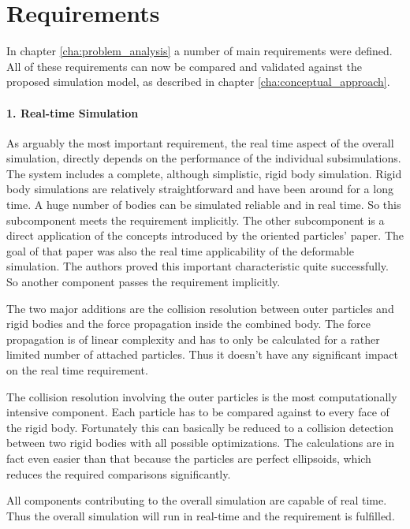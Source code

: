 \section{Requirements}

In chapter \ref{cha:problem_analysis} a number of main requirements were defined. All of these requirements can now be compared and validated against the proposed simulation model, as described in chapter \ref{cha:conceptual_approach}.

\paragraph{1. Real-time Simulation}

As arguably the most important requirement, the real time aspect of the overall simulation, directly depends on the performance of the individual subsimulations. The system includes a complete, although simplistic, rigid body simulation. Rigid body simulations are relatively straightforward and have been around for a long time. A huge number of bodies can be simulated reliable and in real time. So this subcomponent meets the requirement implicitly. The other subcomponent is a direct application of the concepts introduced by the oriented particles' paper. The goal of that paper was also the real time applicability of the deformable simulation. The authors proved this important characteristic quite successfully. So another component passes the requirement implicitly. 

The two major additions are the collision resolution between outer particles and rigid bodies and the force propagation inside the combined body. The force propagation is of linear complexity and has to only be calculated for a rather limited number of attached particles. Thus it doesn't have any significant impact on the real time requirement.

The collision resolution involving the outer particles is the most computationally intensive component. Each particle has to be compared against to every face of the rigid body. Fortunately this can basically be reduced to a collision detection between two rigid bodies with all possible optimizations. The calculations are in fact even easier than that because the particles are perfect ellipsoids, which reduces the required comparisons significantly.

All components contributing to the overall simulation are capable of real time. Thus the overall simulation will run in real-time and the requirement is fulfilled.

